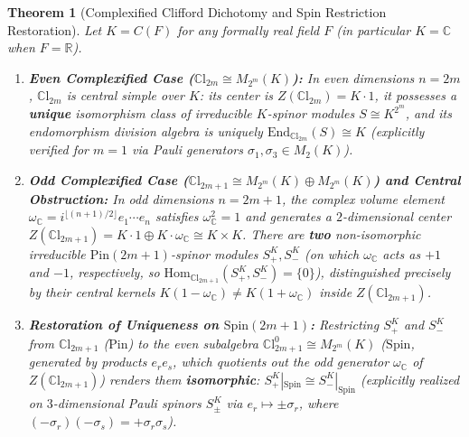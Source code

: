 \documentclass[11pt,a4paper]{article}
\theoremstyle{plain}
\newtheorem{theorem}{Theorem}[section]
\theoremstyle{definition}
\newcommand{\CCl}{\mathbb{C}\mathrm{l}}
\newcommand{\Pin}{\mathrm{Pin}}
\newcommand{\Spin}{\mathrm{Spin}}
\newcommand{\End}{\mathrm{End}}
\newcommand{\Hom}{\mathrm{Hom}}
\newcommand{\R}{\mathbb{R}}
\newcommand{\C}{\mathbb{C}}
\begin{document}
\begin{theorem}[Complexified Clifford Dichotomy and Spin Restriction Restoration]
\label{thm:complex-salvage}
Let $K = C(F)$ for any formally real field $F$ (in particular $K = \C$ when $F = \R$).
\begin{enumerate}
\item[(i)] \textbf{Even Complexified Case ($\CCl_{2m} \cong M_{2^m}(K)$):} In even dimensions $n = 2m$, $\CCl_{2m}$ is central simple over $K$: its center is $Z(\CCl_{2m}) = K \cdot 1$, it possesses a \textbf{unique} isomorphism class of irreducible $K$-spinor modules $S \cong K^{2^m}$, and its endomorphism division algebra is uniquely $\End_{\CCl_{2m}}(S) \cong K$ (explicitly verified for $m=1$ via Pauli generators $\sigma_1, \sigma_3 \in M_2(K)$).
\item[(ii)] \textbf{Odd Complexified Case ($\CCl_{2m+1} \cong M_{2^m}(K) \oplus M_{2^m}(K)$) and Central Obstruction:} In odd dimensions $n = 2m+1$, the complex volume element $\omega_{\C} = i^{\lfloor (n+1)/2 \rfloor} e_1 \cdots e_n$ satisfies $\omega_{\C}^2 = 1$ and generates a $2$-dimensional center $Z(\CCl_{2m+1}) = K \cdot 1 \oplus K \cdot \omega_{\C} \cong K \times K$. There are \textbf{two} non-isomorphic irreducible $\Pin(2m+1)$-spinor modules $S_+^K, S_-^K$ (on which $\omega_{\C}$ acts as $+1$ and $-1$, respectively, so $\Hom_{\CCl_{2m+1}}(S_+^K, S_-^K) = \{0\}$), distinguished precisely by their central kernels $K(1 - \omega_{\C}) \neq K(1 + \omega_{\C})$ inside $Z(\CCl_{2m+1})$.
\item[(iii)] \textbf{Restoration of Uniqueness on $\Spin(2m+1)$:} Restricting $S_+^K$ and $S_-^K$ from $\CCl_{2m+1}$ ($\Pin$) to the even subalgebra $\CCl_{2m+1}^0 \cong M_{2^m}(K)$ ($\Spin$, generated by products $e_r e_s$, which quotients out the odd generator $\omega_{\C}$ of $Z(\CCl_{2m+1})$) renders them \textbf{isomorphic}: $S_+^K|_{\Spin} \cong S_-^K|_{\Spin}$ (explicitly realized on $3$-dimensional Pauli spinors $S_\pm^K$ via $e_r \mapsto \pm\sigma_r$, where $(- \sigma_r)(- \sigma_s) = +\sigma_r \sigma_s$).
\end{enumerate}
\end{theorem}
\end{document}
